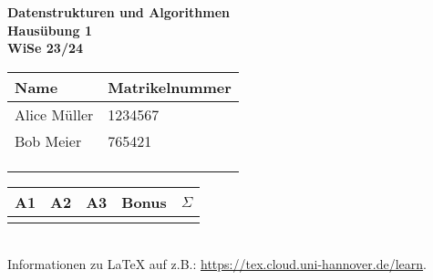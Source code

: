 \documentclass[a4paper,12pt]{scrartcl}
\def\Nr{1}					%
\def\NameA{Alice Müller}	%
\def\MatA{1234567}			%
\def\NameB{Bob Meier}		%
\def\MatB{765421}			%
\def\NameC{}				%
\def\MatC{}					%
\def\NameD{}				%
\def\MatD{}					%
\begin{document}
\begin{center}
	\sffamily
	\bfseries
	\LARGE
	Datenstrukturen und Algorithmen\\
	\Large
	\vspace{.2\parskip}
	Hausübung \Nr\\
	\normalsize\normalfont
	WiSe 23/24
	\vspace{.2\parskip}
\end{center}

\begin{tabular}[t]{p{4.5cm} p{3cm}}
	\toprule
	Name & Matrikelnummer\\
	\midrule
	\NameA & \MatA\\
	\NameB & \MatB\\
	\ifx\NameC\empty\else\NameC & \MatC\\\fi
	\ifx\NameD\empty\else\NameD & \MatD\\\fi
	\bottomrule
\end{tabular}
\hfill
\begin{tabular}[t]{ccccc}
	\toprule
	A1 & A2 & A3 & Bonus & $\Sigma$ \\
	\midrule
	\\
	\bottomrule	
\end{tabular}
\hfill\\


Informationen zu \LaTeX{} auf z.B.: \url{https://tex.cloud.uni-hannover.de/learn}.
\end{document}
